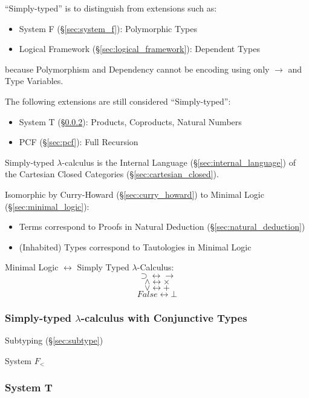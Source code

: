 ``Simply-typed'' is to distinguish from extensions such as:
\begin{itemize}
  \item System F (\S\ref{sec:system_f}): Polymorphic Types
  \item Logical Framework (\S\ref{sec:logical_framework}): Dependent
    Types
\end{itemize}
because Polymorphism and Dependency cannot be encoding using only
$\rightarrow$ and Type Variables.

The following extensions are still considered ``Simply-typed'':
\begin{itemize}
  \item System T (\S\ref{sec:system_t}): Products, Coproducts, Natural
    Numbers
  \item PCF (\S\ref{sec:pcf}): Full Recursion
\end{itemize}

Simply-typed $\lambda$-calculus is the Internal Language
(\S\ref{sec:internal_language}) of the Cartesian Closed Categories
(\S\ref{sec:cartesian_closed}).

Isomorphic by Curry-Howard (\S\ref{sec:curry_howard}) to
Minimal Logic (\S\ref{sec:minimal_logic}):
\begin{itemize}
\item Terms correspond to Proofs in Natural Deduction
  (\S\ref{sec:natural_deduction})
\item (Inhabited) Types correspond to Tautologies in Minimal Logic
\end{itemize}

Minimal Logic $\leftrightarrow$ Simply Typed $\lambda$-Calculus:
\[
  \supset \leftrightarrow \rightarrow
\] \[
  \wedge \leftrightarrow \times
\] \[
  \vee \leftrightarrow +
\] \[
  False \leftrightarrow \bot
\]



\subsubsection{Simply-typed $\lambda$-calculus with Conjunctive Types}
\label{sec:simplytyped_conjunctive}

Subtyping (\S\ref{sec:subtype})

System $F_<$



\subsubsection{System T}\label{sec:system_t}

